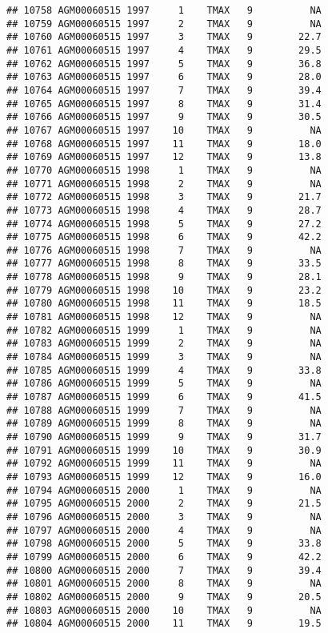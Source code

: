 \documentclass{article}\usepackage[]{graphicx}\usepackage[]{color}
\makeatletter
\newenvironment{kframe}{%
 \def\at@end@of@kframe{}%
 \ifinner\ifhmode%
  \def\at@end@of@kframe{\end{minipage}}%
  \begin{minipage}{\columnwidth}%
 \fi\fi%
 \def\FrameCommand##1{\hskip\@totalleftmargin \hskip-\fboxsep
 \colorbox{shadecolor}{##1}\hskip-\fboxsep
     \hskip-\linewidth \hskip-\@totalleftmargin \hskip\columnwidth}%
 \MakeFramed {\advance\hsize-\width
   \@totalleftmargin\z@ \linewidth\hsize
   \@setminipage}}%
 {\par\unskip\endMakeFramed%
 \at@end@of@kframe}
\newenvironment{knitrout}{}{} %
\makeatother
\begin{document}
\begin{knitrout}
\begin{kframe}
\begin{verbatim}
## 10758 AGM00060515 1997     1    TMAX   9          NA
## 10759 AGM00060515 1997     2    TMAX   9          NA
## 10760 AGM00060515 1997     3    TMAX   9        22.7
## 10761 AGM00060515 1997     4    TMAX   9        29.5
## 10762 AGM00060515 1997     5    TMAX   9        36.8
## 10763 AGM00060515 1997     6    TMAX   9        28.0
## 10764 AGM00060515 1997     7    TMAX   9        39.4
## 10765 AGM00060515 1997     8    TMAX   9        31.4
## 10766 AGM00060515 1997     9    TMAX   9        30.5
## 10767 AGM00060515 1997    10    TMAX   9          NA
## 10768 AGM00060515 1997    11    TMAX   9        18.0
## 10769 AGM00060515 1997    12    TMAX   9        13.8
## 10770 AGM00060515 1998     1    TMAX   9          NA
## 10771 AGM00060515 1998     2    TMAX   9          NA
## 10772 AGM00060515 1998     3    TMAX   9        21.7
## 10773 AGM00060515 1998     4    TMAX   9        28.7
## 10774 AGM00060515 1998     5    TMAX   9        27.2
## 10775 AGM00060515 1998     6    TMAX   9        42.2
## 10776 AGM00060515 1998     7    TMAX   9          NA
## 10777 AGM00060515 1998     8    TMAX   9        33.5
## 10778 AGM00060515 1998     9    TMAX   9        28.1
## 10779 AGM00060515 1998    10    TMAX   9        23.2
## 10780 AGM00060515 1998    11    TMAX   9        18.5
## 10781 AGM00060515 1998    12    TMAX   9          NA
## 10782 AGM00060515 1999     1    TMAX   9          NA
## 10783 AGM00060515 1999     2    TMAX   9          NA
## 10784 AGM00060515 1999     3    TMAX   9          NA
## 10785 AGM00060515 1999     4    TMAX   9        33.8
## 10786 AGM00060515 1999     5    TMAX   9          NA
## 10787 AGM00060515 1999     6    TMAX   9        41.5
## 10788 AGM00060515 1999     7    TMAX   9          NA
## 10789 AGM00060515 1999     8    TMAX   9          NA
## 10790 AGM00060515 1999     9    TMAX   9        31.7
## 10791 AGM00060515 1999    10    TMAX   9        30.9
## 10792 AGM00060515 1999    11    TMAX   9          NA
## 10793 AGM00060515 1999    12    TMAX   9        16.0
## 10794 AGM00060515 2000     1    TMAX   9          NA
## 10795 AGM00060515 2000     2    TMAX   9        21.5
## 10796 AGM00060515 2000     3    TMAX   9          NA
## 10797 AGM00060515 2000     4    TMAX   9          NA
## 10798 AGM00060515 2000     5    TMAX   9        33.8
## 10799 AGM00060515 2000     6    TMAX   9        42.2
## 10800 AGM00060515 2000     7    TMAX   9        39.4
## 10801 AGM00060515 2000     8    TMAX   9          NA
## 10802 AGM00060515 2000     9    TMAX   9        20.5
## 10803 AGM00060515 2000    10    TMAX   9          NA
## 10804 AGM00060515 2000    11    TMAX   9        19.5

\end{verbatim}
\end{kframe}
\end{knitrout}
\end{document}
